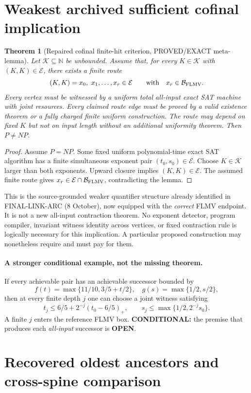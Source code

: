 \documentclass[11pt]{article}
\newtheorem{theorem}{Theorem}
\newcommand{\E}{\mathcal E}
\newcommand{\B}{\mathcal B}
\newcommand{\OPEN}{\textbf{OPEN}}
\begin{document}
\section{Weakest archived sufficient cofinal implication}
\begin{theorem}[Repaired cofinal finite-hit criterion, PROVED/EXACT meta-lemma]
Let $\mathcal K\subseteq\mathbb N$ be unbounded. Assume that, for every $K\in\mathcal K$ with $(K,K)\in\E$, there exists a \emph{finite} route
\[
(K,K)=x_0,\ x_1,\ldots,x_r\in\E
\qquad\text{with}\quad x_r\in\B_{\rm FLMV}.
\]
Every vertex must be witnessed by a uniform total all-input exact SAT machine with \emph{joint} resources. Every claimed route edge must be proved by a valid existence theorem or a fully charged finite uniform construction. The route may depend on fixed $K$ but not on input length without an additional uniformity theorem. Then $P\ne NP$.
\end{theorem}
\begin{proof}
Assume $P=NP$. Some fixed uniform polynomial-time exact SAT algorithm has a finite simultaneous exponent pair $(t_0,s_0)\in\E$. Choose $K\in\mathcal K$ larger than both exponents. Upward closure implies $(K,K)\in\E$. The assumed finite route gives $x_r\in\E\cap\B_{\rm FLMV}$, contradicting the lemma.
\end{proof}
This is the source-grounded weaker quantifier structure already identified in FINAL-LINK-ARC (8 October), now equipped with the \emph{correct} FLMV endpoint. It is not a new all-input contraction theorem. No exponent detector, program compiler, invariant witness identity across vertices, or fixed contraction rule is logically necessary for this implication. A particular proposed construction may nonetheless require and must pay for them.

\paragraph{A stronger conditional example, not the missing theorem.}
If every achievable pair has an achievable successor bounded by
\[
f(t)=\max\{11/10,3/5+t/2\},\quad
g(s)=\max\{1/2,s/2\},
\]
then at every finite depth $j$ one can choose a joint witness satisfying
\[
t_j\le 6/5+2^{-j}(t_0-6/5)_+,\qquad
s_j\le\max\{1/2,2^{-j}s_0\}.
\]
A finite $j$ enters the reference FLMV box. \textbf{CONDITIONAL:} the premise that produces each \emph{all-input} successor is \OPEN.

\section{Recovered oldest ancestors and cross-spine comparison}
\end{document}

